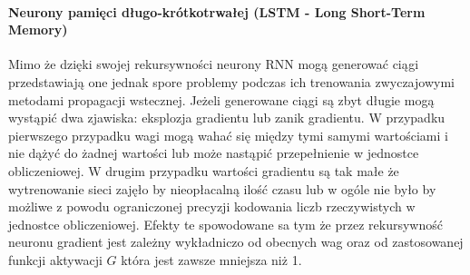 \paragraph{Neurony pamięci długo-krótkotrwałej (LSTM - Long Short-Term Memory)}
Mimo że dzięki swojej rekursywności neurony RNN mogą generować ciągi przedstawiają one jednak spore problemy podczas ich trenowania zwyczajowymi metodami propagacji wstecznej. Jeżeli generowane ciągi są zbyt długie mogą wystąpić dwa zjawiska: eksplozja gradientu lub zanik gradientu. W przypadku pierwszego przypadku wagi mogą wahać się między tymi samymi wartościami i nie dążyć do żadnej wartości lub może nastąpić przepełnienie w jednostce obliczeniowej. W drugim przypadku wartości gradientu są tak małe że wytrenowanie sieci zajęło by nieopłacalną ilość czasu lub w ogóle nie było by możliwe z powodu ograniczonej precyzji kodowania liczb rzeczywistych w jednostce obliczeniowej. Efekty te spowodowane sa tym że przez rekursywność neuronu gradient jest zależny wykładniczo od obecnych wag oraz od zastosowanej funkcji aktywacji $G$ która jest zawsze mniejsza niż 1.\cite[p.~18]{LSTM-intro}

